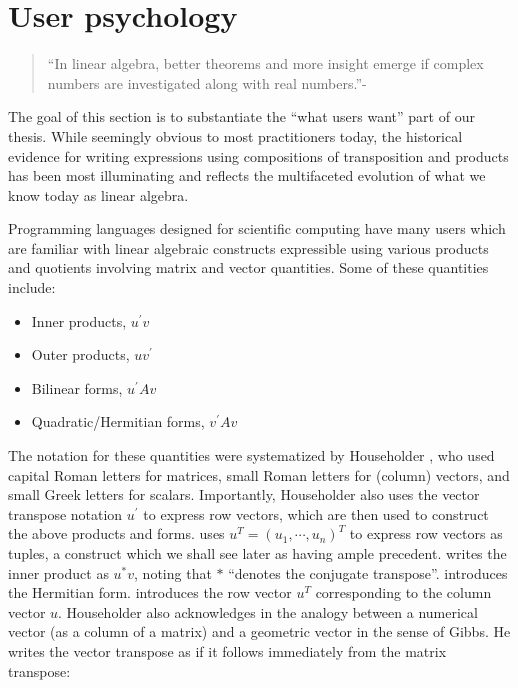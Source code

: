\section{User psychology}

\begin{quote}
``In linear algebra, better theorems and more insight emerge if complex numbers
are investigated along with real numbers.''-\cite[p. 1]{Axler2015}
\end{quote}

The goal of this section is to substantiate the ``what users want'' part of our
thesis. While seemingly obvious to most practitioners today, the historical
evidence for writing expressions using compositions of transposition and
products has been most illuminating and reflects the multifaceted evolution of
what we know today as linear algebra.

Programming languages designed for scientific computing have many users which
are familiar with linear algebraic constructs expressible using various
products and quotients involving matrix and vector quantities. Some of these
quantities include:

\begin{itemize}
  \item Inner products, $u^\prime v$
  \item Outer products, $u v^\prime$
  \item Bilinear forms, $u^\prime A v$
  \item Quadratic/Hermitian forms, $v^\prime A v$
\end{itemize}

The notation for these quantities were systematized by Householder
\cite{Householder1953,Householder1955}, who used capital Roman letters for
matrices, small Roman letters for (column) vectors, and small Greek letters for
scalars. Importantly, Householder also uses the vector transpose notation
$u^\prime$ to express row vectors, which are then used to construct the above
products and forms. \cite{Householder1955} uses $u^T = {(u_1, \cdots, u_n)}^T$ to
express row vectors as tuples, a construct which we shall see later as having
ample precedent. \cite{Householder1955} writes the inner product as $u^* v$,
noting that $*$ ``denotes the conjugate transpose''. \cite[Sec.
4.01]{Householder1953} introduces the Hermitian form. \cite[Sec.
2.04]{Householder1953} introduces the row vector $u^T$ corresponding to the
column vector $u$. Householder also acknowledges in \cite[Sec.
2.04]{Householder1953} the analogy between a numerical vector (as a column of a
matrix) and a geometric vector in the sense of Gibbs. He writes the vector
transpose as if it follows immediately from the matrix transpose:

